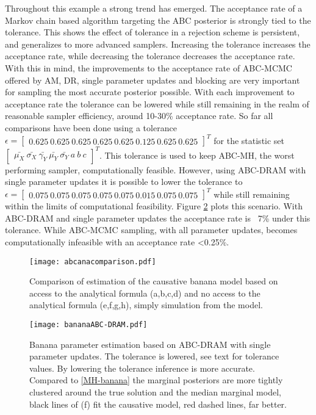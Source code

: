 Throughout this example a strong trend has emerged. The acceptance rate of a Markov chain based algorithm targeting the ABC posterior is strongly tied to the tolerance. This shows the effect of tolerance in a rejection scheme is persistent, and generalizes to more advanced samplers. Increasing the tolerance increases the acceptance rate, while decreasing the tolerance decreases the acceptance rate. With this in mind, the improvements to the acceptance rate of ABC-MCMC offered by AM, DR, single parameter updates and blocking are very important for sampling the most accurate posterior possible. With each improvement to acceptance rate the tolerance can be lowered while still remaining in the realm of reasonable sampler efficiency, around 10-30\% acceptance rate. So far all comparisons have been done using a tolerance $\epsilon =\begin{bmatrix}
0.625\ 0.625\ 0.625\ 0.625\ 0.625\ 0.125\ 0.625\ 0.625
\end{bmatrix}^T$ 
for the statistic set $\begin{bmatrix}
\bar{\mu_X}\ \bar{\sigma_X}\ \bar{\gamma_Y}\ \bar{\mu_Y}\ \bar{\sigma_Y}\ a\ b\ c
\end{bmatrix}^T$. This tolerance is used to keep ABC-MH, the worst performing sampler, computationally feasible. However, using ABC-DRAM with single parameter updates it is possible to lower the tolerance to 
$\epsilon = \begin{bmatrix}
0.075\ 0.075\ 0.075\ 0.075\ 0.075\ 0.015\ 0.075\ 0.075
\end{bmatrix}^T$
while still remaining within the limits of computational feasibility. Figure \ref{best-banana} plots this scenario. With ABC-DRAM and single parameter updates the acceptance rate is ~7\% under this tolerance. While ABC-MCMC sampling, with all parameter updates, becomes computationally infeasible with an acceptance rate <0.25\%.

\begin{figure}[H]
\centering
\texttt{[image: abcanacomparison.pdf]}
\caption{Comparison of estimation of the causative banana model based on access to the analytical formula (a,b,c,d) and no access to the analytical formula (e,f,g,h), simply simulation from the model.}
\label{the-comparison}
\end{figure}

\begin{figure}[H]
\centering
\texttt{[image: bananaABC-DRAM.pdf]}
\caption{Banana parameter estimation based on ABC-DRAM with single parameter updates. The tolerance is lowered, see text for tolerance values. By lowering the tolerance inference is more accurate. Compared to \ref{MH-banana} the marginal posteriors are more tightly clustered around the true solution and the median marginal model, black lines of (f) fit the causative model, red dashed lines, far better.}
\label{best-banana}
\end{figure}